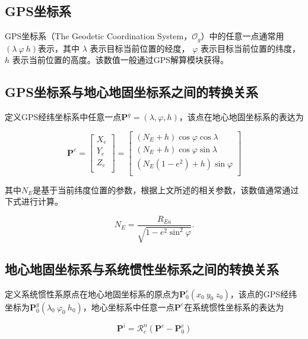 \subsection{GPS坐标系}
GPS坐标系（The Geodetic Coordination System，$\mathcal{O}_g$）中的任意一点通常用$(\lambda\ \varphi\ h)$表示，其中 $\lambda$ 表示目标当前位置的经度， $\varphi$ 表示目标当前位置的纬度， $h$ 表示当前位置的高度。该数值一般通过GPS解算模块获得。

\subsection{GPS坐标系与地心地固坐标系之间的转换关系}
定义GPS经纬坐标系中任意一点$\mathbf{P}^g=(\lambda, \varphi, h)$，该点在地心地固坐标系的表达为

\begin{equation}
	\textbf{P}^e
	=
	\left[\begin{array}{c}
		X_e\\
		Y_e\\
		Z_e\\
	\end{array}\right]
	=
	\left[\begin{array}{c}
		(N_E+h)\cos \varphi \cos \lambda\\
		(N_E+h)\cos \varphi \sin \lambda\\
		(N_E(1-e^2)+h)\sin \varphi\\
	\end{array}\right]
\end{equation}

其中$N_E$是基于当前纬度位置的参数，根据上文所述的相关参数，该数值通常通过下式进行计算。

\begin{equation}
	N_E=\frac{R_{Ea}}{\sqrt{1-e^2 \sin^2 \varphi}}.
\end{equation}

\subsection{地心地固坐标系与系统惯性坐标系之间的转换关系}
定义系统惯性系原点在地心地固坐标系的原点为$\mathbf{P}_0^e(x_0\ y_0\ z_0)$，该点的GPS经纬坐标为$\mathbf{P}_0^g(\lambda_0\ \varphi_0\ h_0)$，地心坐标系中任意一点$\mathbf{P}^e$在系统惯性坐标系的表达为

\begin{equation}
	\textbf{P}^i=\mathcal{R}_e^n(\textbf{P}^e - \textbf{P}_0^e)
\end{equation}

